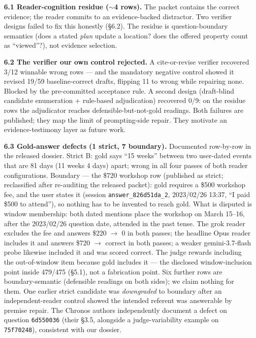 \documentclass[11pt]{article}
\begin{document}
\textbf{6.1 Reader-cognition residue ($\sim$4 rows).} The packet contains the
correct evidence; the reader commits to an evidence-backed distractor. Two
verifier designs failed to fix this honestly (\S6.2). The residue is
question-boundary semantics (does a stated \emph{plan} update a
location? does the offered property count as ``viewed''?), not evidence
selection.

\textbf{6.2 The verifier our own control rejected.} A cite-or-revise verifier
recovered 3/12 winnable wrong rows --- and the mandatory negative control
showed it revised 19/59 baseline-correct drafts, flipping 11 to wrong while
repairing none. Blocked by the pre-committed acceptance rule. A second design
(draft-blind candidate enumeration + rule-based adjudication) recovered
0/9: on the residue rows the adjudicator reaches defensible-but-not-gold
readings.
Both failures are published; they map the limit of prompting-side repair.
They motivate an evidence-testimony layer as future work.

\textbf{6.3 Gold-answer defects (1 strict, 7 boundary).} Documented row-by-row
in the released dossier. Strict B: gold says ``15 weeks'' between two
user-dated events that are 81 days (11 weeks 4 days) apart; wrong in all four
passes of both reader configurations. Boundary --- the \$720 workshop row
(published as strict; reclassified after re-auditing the released packet):
gold requires a \$500 workshop fee, and the user states it (session
\texttt{answer\_826d51da\_2}, 2023/02/26 13:37, ``I paid \$500 to attend''),
so nothing has to be invented to reach gold. What is disputed is window
membership: both dated mentions place the workshop on March 15--16, after the
2023/02/26 question date, attended in the past tense. The grok reader excludes
the fee and answers \$220 $\to$ 0 in both passes; the headline Opus reader
includes it and answers \$720 $\to$ correct in both passes; a weaker
gemini-3.7-flash probe likewise included it and was scored correct. The judge
rewards including the out-of-window item because gold includes it --- the
disclosed window-inclusion point inside 479/475 (\S5.1), not a fabrication
point. Six further rows are boundary-semantic (defensible readings on both
sides); we claim nothing for them. One earlier strict candidate was
\emph{downgraded} to boundary after an independent-reader control showed the
intended referent was answerable by premise repair. The Chronos authors
independently document a defect on question \texttt{6d550036} (their \S3.5,
alongside a judge-variability example on \texttt{75f70248}), consistent with
our dossier.
\end{document}
